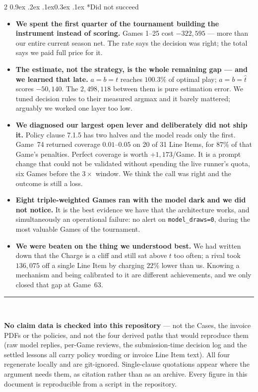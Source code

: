 \documentclass[9pt,a4paper,twocolumn]{article}
\makeatletter
\renewcommand\subsection{\@startsection{subsection}{2}{\z@}%
  {0.9ex \@plus .2ex \@minus .1ex}{0.3ex \@plus .1ex}%
  {\normalfont\small\bfseries}}
\newcommand{\charge}{a}
\newcommand{\limitv}{b}
\newcommand{\fair}{t}
\newcommand{\est}{\hat{t}}
\makeatother
\begin{document}
\begin{multicols}{2}
\subsection*{Did not succeed}
\begin{itemize}
\item \textbf{We spent the first quarter of the tournament building the instrument instead of
scoring.} Games 1--25 cost $-322{,}595$ --- more than our entire current season net. The rate says
the decision was right; the total says we paid full price for it.
\item \textbf{The estimate, not the strategy, is the whole remaining gap --- and we learned that
late.} $\charge=\limitv=\fair$ reaches $100.3\%$ of optimal play; $\charge=\limitv=\est$ scores
$-50{,}140$. The $2{,}498{,}118$ between them is pure estimation error. We tuned decision rules to
their measured argmax and it barely mattered; arguably we worked one layer too low.
\item \textbf{We diagnosed our largest open lever and deliberately did not ship it.} Policy clause
7.1.5 has two halves and the model reads only the first. Game~74 returned coverage $0.01$--$0.05$
on 20 of 31 Line Items, for $87\%$ of that Game's penalties. Perfect coverage is worth
$+1{,}173$/Game. It is a prompt change that could not be validated without spending the live
runner's quota, six Games before the $3\times$ window. We think the call was right and the outcome
is still a loss.
\item \textbf{Eight triple-weighted Games ran with the model dark and we did not notice.} It is the
best evidence we have that the architecture works, and simultaneously an operational failure: no
alert on \texttt{model\_draws=0}, during the most valuable Games of the tournament.
\item \textbf{We were beaten on the thing we understood best.} We had written down that the Charge
is a cliff and still sat above $\fair$ too often; a rival took $136{,}075$ off a single Line Item
by charging $22\%$ lower than us. Knowing a mechanism and being calibrated to it are different
achievements, and we only closed that gap at Game~63.
\end{itemize}
\end{multicols}

\vspace{0.6em}
\noindent\rule{\linewidth}{0.4pt}\\[0.3em]
{\footnotesize\textbf{No claim data is checked into this repository} --- not the Cases, the invoice
PDFs or the policies, and not the four derived paths that would reproduce them (raw model replies,
per-Game reviews, the submission-time decision log and the settled lessons all carry policy wording
or invoice Line Item text). All four regenerate locally and are git-ignored. Single-clause
quotations appear where the argument needs them, as citation rather than as an archive.
Every figure in this document is reproducible from a script in the repository.\par}
\end{document}
